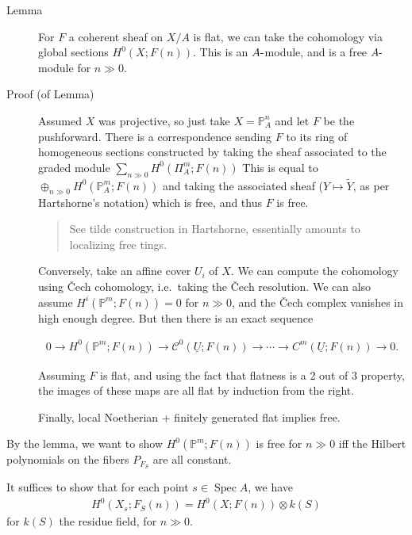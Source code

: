 \begin{description}
\item[Lemma]
For \(F\) a coherent sheaf on \(X/A\) is flat, we can take the
cohomology via global sections \(H^0(X; F(n))\). This is an
\(A{\hbox{-}}\)module, and is a free \(A{\hbox{-}}\)module for
\(n\gg 0\).
\item[Proof (of Lemma)]
Assumed \(X\) was projective, so just take \(X = {\mathbb{P}}_A^n\) and
let \(F\) be the pushforward. There is a correspondence sending \(F\) to
its ring of homogeneous sections constructed by taking the sheaf
associated to the graded module \(\sum_{n\gg0} H^0( \Pi_A^m; F(n) )\)
This is equal to \(\oplus_{n \gg 0} H^0({\mathbb{P}}_A^m; F(n))\) and
taking the associated sheaf (\(Y \mapsto \tilde Y\), as per Hartshorne's
notation) which is free, and thus \(F\) is free.

\begin{quote}
See tilde construction in Hartshorne, essentially amounts to localizing
free tings.
\end{quote}

Conversely, take an affine cover \(U_i\) of \(X\). We can compute the
cohomology using Čech cohomology, i.e.~taking the Čech resolution. We
can also assume \(H^i({\mathbb{P}}^m; F(n)) = 0\) for \(n \gg 0\), and
the Čech complex vanishes in high enough degree. But then there is an
exact sequence

\begin{align*} 0 \to H^0({\mathbb{P}}^m; F(n)) \to \mathcal C^0( \underline{U}; F(n) ) \to \cdots \to C^m( \underline{U}; F(n) ) \to 0 .\end{align*}

Assuming \(F\) is flat, and using the fact that flatness is a 2 out of 3
property, the images of these maps are all flat by induction from the
right.

Finally, local Noetherian + finitely generated flat implies free.
\end{description}

By the lemma, we want to show \(H^0({\mathbb{P}}^m; F(n))\) is free for
\(n\gg 0\) iff the Hilbert polynomials on the fibers \(P_{F_S}\) are all
constant.

\begin{description}
\tightlist
\item[Claim (1)]
It suffices to show that for each point \(s\in \operatorname{Spec}A\),
we have
\begin{align*}
  H^0(X_s; F_S(n)) = H^0(X; F(n)) \otimes k(S)
  \end{align*}
for \(k(S)\) the residue field, for \(n\gg 0\).
\end{description}

